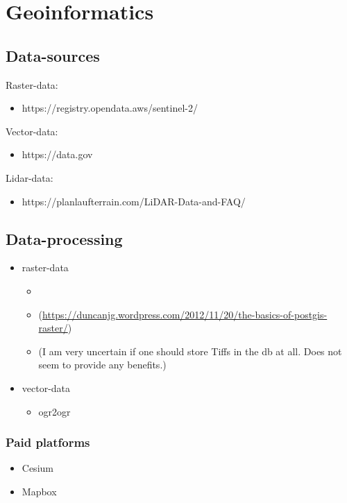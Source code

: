 \section{Geoinformatics}

\subsection{Data-sources}

Raster-data:
\begin{itemize}
    \item https://registry.opendata.aws/sentinel-2/
\end{itemize}

Vector-data:
\begin{itemize}
    \item https://data.gov
\end{itemize}

Lidar-data:
\begin{itemize}
    \item https://planlaufterrain.com/LiDAR-Data-and-FAQ/
\end{itemize}



\subsection{Data-processing}

\begin{itemize}
    \item raster-data \begin{itemize}
        \item {} 
        \item {} (\href{docs}{https://duncanjg.wordpress.com/2012/11/20/the-basics-of-postgis-raster/})
        \item {} (I am very uncertain if one should store Tiffs in the db at all. Does not seem to provide any benefits.)
    \end{itemize}
    \item vector-data \begin{itemize}
        \item ogr2ogr
    \end{itemize}
\end{itemize}


\subsubsection{Paid platforms}
\begin{itemize}
    \item Cesium
    \item Mapbox
\end{itemize}


